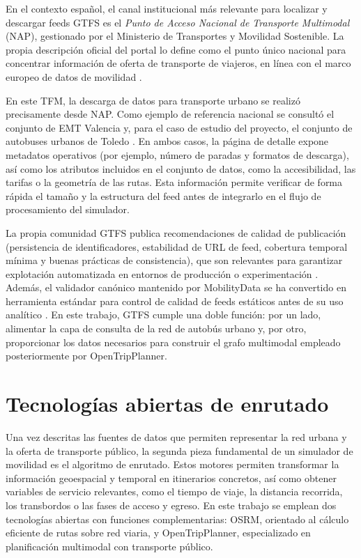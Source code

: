 En el contexto español, el canal institucional más relevante para localizar y descargar feeds GTFS es el \textit{Punto de Acceso Nacional de Transporte Multimodal} (NAP), gestionado por el Ministerio de Transportes y Movilidad Sostenible. La propia descripción oficial del portal lo define como el punto único nacional para concentrar información de oferta de transporte de viajeros, en línea con el marco europeo de datos de movilidad \cite{NAPHome,NAPQuienesSomos}.

En este TFM, la descarga de datos para transporte urbano se realizó precisamente desde NAP. Como ejemplo de referencia nacional se consultó el conjunto de EMT Valencia y, para el caso de estudio del proyecto, el conjunto de autobuses urbanos de Toledo \cite{NAPEMTValencia,NAPToledoUrbano}. En ambos casos, la página de detalle expone metadatos operativos (por ejemplo, número de paradas y formatos de descarga), así como los atributos incluidos en el conjunto de datos, como la accesibilidad, las tarifas o la geometría de las rutas. Esta información permite verificar de forma rápida el tamaño y la estructura del feed antes de integrarlo en el flujo de procesamiento del simulador.

La propia comunidad GTFS publica recomendaciones de calidad de publicación (persistencia de identificadores, estabilidad de URL de feed, cobertura temporal mínima y buenas prácticas de consistencia), que son relevantes para garantizar explotación automatizada en entornos de producción o experimentación \cite{GTFSBestPractices}. Además, el validador canónico mantenido por MobilityData se ha convertido en herramienta estándar para control de calidad de feeds estáticos antes de su uso analítico \cite{GTFSValidator}. En este trabajo, GTFS cumple una doble función: por un lado, alimentar la capa de consulta de la red de autobús urbano y, por otro, proporcionar los datos necesarios para construir el grafo multimodal empleado posteriormente por OpenTripPlanner.

\section{Tecnologías abiertas de enrutado}

Una vez descritas las fuentes de datos que permiten representar la red urbana y la oferta de transporte público, la segunda pieza fundamental de un simulador de movilidad es el algoritmo de enrutado. Estos motores permiten transformar la información geoespacial y temporal en itinerarios concretos, así como obtener variables de servicio relevantes, como el tiempo de viaje, la distancia recorrida, los transbordos o las fases de acceso y egreso. En este trabajo se emplean dos tecnologías abiertas con funciones complementarias: OSRM, orientado al cálculo eficiente de rutas sobre red viaria, y OpenTripPlanner, especializado en planificación multimodal con transporte público.


